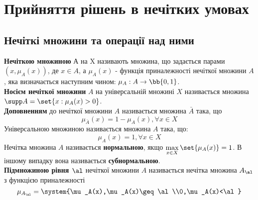\section{Прийняття рішень в нечітких умовах}
\subsection{Нечіткі множини та операції над ними}
\textbf{Нечіткою множиною} А на X називають множина, що задається парами $(x,\mu_A(x))$, де $x\in A$, а $\mu_A(x)$ - функція приналежності нечіткої множини $A$, яка визначається наступним чином: $\mu_A:A\to\bb{0,1}$.\\
\textbf{Носієм нечіткої множини} $A$ на універсальній множині $X$ називається множина $\supp A=\set{x:\mu_A(x)>0}$.\\
\textbf{Доповненням} до нечіткої множини $A$ називається множина $\bar A$ така, що 
\begin{equation}
\mu_{\bar A}(x) = 1 - \mu_A(x),\forall x\in X
\end{equation}
Універсальною множиною називається множина $A$ така, що:
\begin{equation}
\mu_A(x) =1,\forall x\in X
\end{equation}
Нечітка множина $A$ називається \textbf{нормальною}, якщо $\max\limits_{x\in X}\set{\mu_A(x)}=1$. В іншому випадку вона називається \textbf{субнормальною}.\\
\textbf{Підмножиною рівня $\al$} нечіткої множини $A$ називається нечітка множина $A_\al$ з функцією приналежності
\begin{equation}
\mu_{A_\al}=\system{\mu_A(x),\mu_A(x)\geq \al\\0,\mu_A(x)<\al}
\end{equation}
